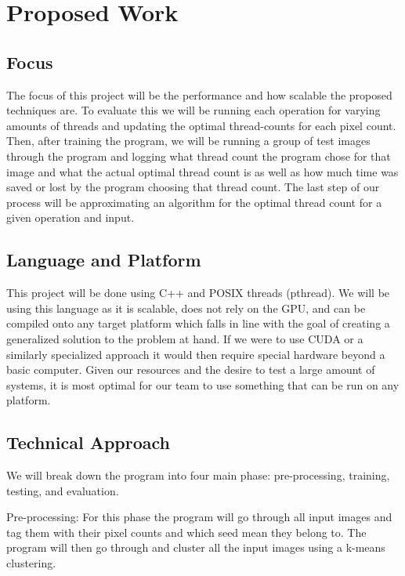 \documentclass{article}
\begin{document}
    \section{Proposed Work}
        \begin{multicols}{2}
            \subsection{Focus}
                The focus of this project will be the performance and how scalable the proposed techniques are.  To evaluate this we will be running each operation for varying amounts of threads and updating the optimal thread-counts for each pixel count.  Then, after training the program, we will be running a group of test images through the program and logging what thread count the program chose for that image and what the actual optimal thread count is as well as how much time was saved or lost by the program choosing that thread count.  The last step of our process will be approximating an algorithm for the optimal thread count for a given operation and input.
            
            \subsection{Language and Platform}
                This project will be done using C++ and POSIX threads (pthread). We will be using this language as it is scalable, does not rely on the GPU, and can be compiled onto any target platform which falls in line with the goal of creating a generalized solution to the problem at hand.  If we were to use CUDA or a similarly specialized approach it would then require special hardware beyond a basic computer.  Given our resources and the desire to test a large amount of systems, it is most optimal for our team to use something that can be run on any platform.
        
            \subsection{Technical Approach}
                We will break down the program into four main phase: pre-processing, training, testing, and evaluation.

                
                Pre-processing:  For this phase the program will go through all input images and tag them with their pixel counts and which seed mean they belong to.  The program will then go through and cluster all the input images using a k-means clustering.
                

\end{multicols}
\end{document}

